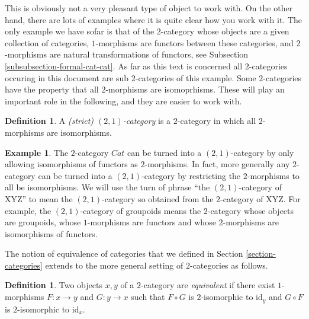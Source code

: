 \documentclass{amsart}
\theoremstyle{definition}
\newtheorem{definition}[theorem]{Definition}
\newtheorem{example}[theorem]{Example}
\theoremstyle{remark}
\numberwithin{equation}{subsection}
\begin{document}
\noindent
This is obviously not a very pleasant type of object to work with.
On the other hand, there are lots of examples where it is quite clear
how you work with it. The only example we have sofar is that of
the $2$-category whose objects are a given collection of categories,
$1$-morphisms are functors between these categories,
and $2$-morphisms are natural transformations of functors, see
Subsection \ref{subsubsection-formal-cat-cat}.
As far as this text is concerned
all $2$-categories occuring in this document are sub $2$-categories
of this example. Some $2$-categories have the property that all $2$-morphisms
are isomoprhisms. These will play an important role in the following,
and they are easier to work with.

\begin{definition}
\label{definition-2-1-category}
A {\it (strict) $(2,1)$-category} is a $2$-category in which all
$2$-morphisms are isomorphisms.
\end{definition}

\begin{example}
\label{example-2-1-category-of-categories}
The $2$-category $\textit{Cat}$ can be turned into a
$(2,1)$-category by only allowing isomorphisms of functors
as $2$-morphisms. In fact, more generally any $2$-category
can be turned into a $(2,1)$-category by restricting
the $2$-morphisms to all be isomorphisms. We will use the turn of phrase
``the $(2,1)$-category of XYZ'' to mean the $(2,1)$-category
so obtained from the $2$-category of XYZ. For example,
the $(2,1)$-category of groupoids means the
$2$-category whose objects are groupoids, whose
$1$-morphisms are functors and whose $2$-morphisms are
isomorphisms of functors.
\end{example}

\medskip\noindent
The notion of equivalence of categories that we defined in Section
\ref{section-categories} extends to the more general setting of
$2$-categories as follows.

\begin{definition}
\label{definition-equivalence}
Two objects $x,y$ of a $2$-category are {\it equivalent} if there exist 
$1$-morphisms $F : x \to y$ and $G : y \to x$ such that $F \circ G$ is 
$2$-isomorphic to $\text{id}_y$ and $G \circ F$ is $2$-isomorphic to 
$\text{id}_x$.
\end{definition}
\end{document}
